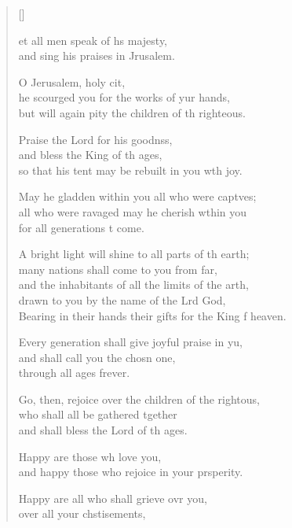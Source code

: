 \settowidth{\versewidth}{Bearing in their hands their gifts for the King of heaven.}
\begin{verse}[\versewidth]
  \begin{patverse}
et all men speak of h\pointup{\i}s majesty,\Med\\
and sing his praises in Jrusalem.

O Jerusalem, holy cit,\Flex\\
he scourged you for the works of yur hands,\Med\\
but will again pity the children of th righteous.

Praise the Lord for his goodnss,\Flex\\
and bless the King of th ages,\Med\\
so that his tent may be rebuilt in you w\pointup{\i}th joy.

May he gladden within you all who were capt\pointup{\i}ves;\Flex\\
all who were ravaged may he cherish w\pointup{\i}thin you\Med\\
for all generations t come.

A bright light will shine to all parts of th earth;\Med\\
many nations shall come to you from far,\\
and the inhabitants of all the limits of the arth,\Flex\\
drawn to you by the name of the Lrd God,\Med\\
Bearing in their hands their gifts for the King f heaven.

Every generation shall give joyful praise in yu,\Flex\\
and shall call you the chosn one,\Med\\
through all ages frever.

Go, then, rejoice over the children of the rightous,\Flex\\
who shall all be gathered tgether\Med\\
and shall bless the Lord of th ages.

Happy are those wh love you,\Med\\
and happy those who rejoice in your prsperity.

Happy are all who shall grieve ovr you,\Med\\
over all your chstisements,


\end{patverse}
\end{verse}
